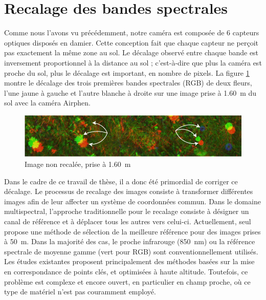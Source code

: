 \documentclass[../thesis.tex]{subfiles}
\begin{document}
    \section{Recalage des bandes spectrales}
	\label{chap:image-registration}
	
	Comme nous l'avons vu précédemment, notre caméra est composée de 6 capteurs optiques disposés en damier. Cette conception fait que chaque capteur ne perçoit pas exactement la même zone au sol. Le décalage observé entre chaque bande est inversement proportionnel à la distance au sol ; c'est-à-dire que plus la caméra est proche du sol, plus le décalage est important, en nombre de pixels. La figure \ref{fig:uncorrected} montre le décalage des trois premières bandes spectrales (RGB) de deux fleurs, l'une jaune à gauche et l'autre blanche à droite sur une image prise à \SI{1.60}{m} du sol avec la caméra Airphen. %
    
    \begin{figure}[H]
        \centering
        \includegraphics[width=\linewidth]{img/preprocessing/uncorrected}
        \caption{Image non recalée, prise à \SI{1.60}{m}}
        \label{fig:uncorrected}
    \end{figure}
    
    Dans le cadre de ce travail de thèse, il a donc été primordial de corriger ce décalage. Le processus de recalage des images consiste à transformer différentes images afin de leur affecter un système de coordonnées commun. Dans le domaine multispectral, l'approche traditionnelle pour le recalage consiste à désigner un canal de référence et à déplacer tous les autres vers celui-ci. Actuellement, seul \cite{Junior2019DetectionOC} propose une méthode de sélection de la meilleure référence pour des images prises à \SI{50}{m}. Dans la majorité des cas, le proche infrarouge (\SI{850}{nm}) ou la référence spectrale de moyenne gamme (vert pour RGB) sont conventionnellement utilisés. Les études existantes proposent principalement des méthodes basées sur la mise en correspondance de points clés, et optimisées à haute altitude. Toutefois, ce problème est complexe et encore ouvert, en particulier en champ proche, où ce type de matériel n'est pas couramment employé.
	
\end{document}
